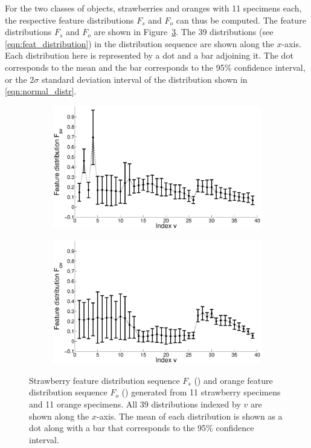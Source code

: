 \documentclass {udthesis}
\begin{document}
For the two classes of objects, strawberries and oranges with 11 specimens each, the respective feature distributions $F_s$ and $F_o$ can thus be computed. The feature distributions $F_s$ and $F_o$ are shown in Figure~\ref{fig:feat_distr}. The 39 distributions (see \eqref{eqn:feat_distribution}) in the distribution sequence are shown along the $x$-axis. Each distribution here is represented by a dot and a bar adjoining it. The dot corresponds to the mean and the bar corresponds to the 95\% confidence interval, or the $2\sigma$ standard deviation interval of the distribution shown in \eqref{eqn:normal_distr}.
%
\begin{figure}
  \centering
  \begin{subfigure}[]{0.8\textwidth}
      \includegraphics[width=\textwidth]{strawberry_learning_feature_distribution}
      \caption{}
      \label{fig:feat_distr_strawberry}
  \end{subfigure}
  \begin{subfigure}[]{0.8\textwidth}
      \includegraphics[width=\textwidth]{orange_learning_feature_distribution}
      \caption{}
      \label{fig:feat_distr_orange}
  \end{subfigure}
\caption[Feature distribution]{Strawberry feature distribution sequence $F_s$ () and orange feature distribution sequence $F_o$ () generated from 11 strawberry specimens and 11 orange specimens. All 39 distributions indexed by $v$ are shown along the $x$-axis. The  mean of each distribution is shown as a dot along with a bar that corresponds to the 95\% confidence interval.}
\label{fig:feat_distr}
\end{figure}	
%
\end{document}
